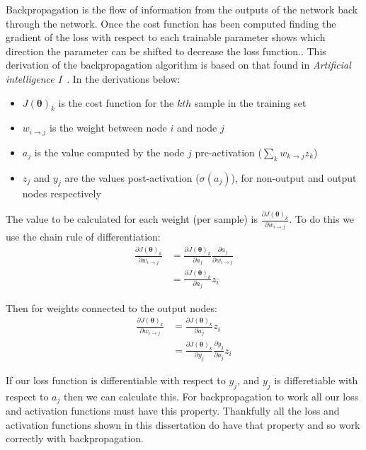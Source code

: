 \documentclass[12pt,a4paper,twoside,openright]{report}
\renewcommand{\vec}[1]{\bm{#1}}
\begin{document}
Backpropagation is the flow of information from the outputs of the network back through the network. Once the cost function has been computed
finding the gradient of the loss with respect to each trainable parameter shows which direction the parameter can be shifted to decrease 
the loss function.. This derivation of the backpropagation algorithm is based on that found in \textit{Artificial intelligence I}~\cite{Art_Int}.
In the derivations below:
\begin{itemize}
  \item $J(\vec{\theta})_k$ is the cost function for the $kth$ sample in the training set
  \item $w_{i \to j}$ is the weight between node $i$ and node $j$
  \item $a_j$ is the value computed by the node $j$ pre-activation ($\sum_{k} w_{k \to j} z_k$)
  \item $z_j$ and $y_j$ are the values post-activation ($\sigma(a_j)$), for non-output and output nodes respectively
\end{itemize}

The value to be calculated for each weight (per sample) is $\frac{\partial J(\vec{\theta})_k}{\partial w_{i \to j}}$. To do this we use the chain rule
of differentiation:
\begin{align}
  \frac{\partial J(\vec{\theta})_k}{\partial w_{i \to j}} & = \frac{\partial J(\vec{\theta})_k}{\partial a_j} \frac{\partial a_j}{\partial w_{i \to j}} \\
  & = \frac{\partial J(\vec{\theta})_k}{\partial a_j} z_i
\end{align}

Then for weights connected to the output nodes:
\begin{align}
  \frac{\partial J(\vec{\theta})_k}{\partial w_{i \to j}} & = \frac{\partial J(\vec{\theta})_k}{\partial a_j} z_i \\
  & = \frac{\partial J(\vec{\theta})_k}{\partial y_j} \frac{\partial y_j}{\partial a_j} z_i
\end{align}

If our loss function is differentiable with respect to $y_j$, and $y_j$ is differetiable with respect to $a_j$ then we can calculate this.  
For backpropagation to work all our loss and activation functions must have this property. Thankfully all the loss and activation functions 
shown in this dissertation do have that property and so work correctly with backpropagation.
\end{document}
